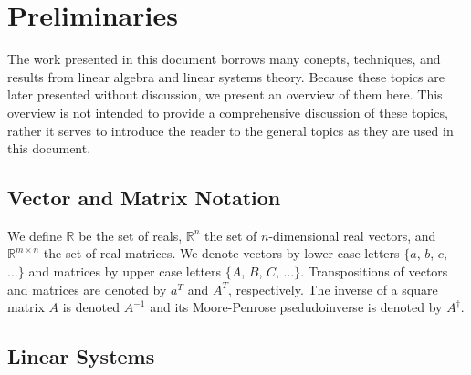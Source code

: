\chapter{Preliminaries}
The work presented in this document borrows many conepts, techniques, and results from linear algebra and linear systems theory. Because these topics are later presented without discussion, we present an overview of them here. This overview is not intended to provide a comprehensive discussion of these topics, rather it serves to introduce the reader to the general topics as they are used in this document.

\section{Vector and Matrix Notation}
We define $\mathbb{R}$ be the set of reals, $\mathbb{R}^n$ the set of $n$-dimensional real vectors, and $\mathbb{R}^{m\times n}$ the set of real matrices. We denote vectors by lower case letters $\{a$, $b$, $c$, $\dots\}$ and matrices by upper case letters $\{A$, $B$, $C$, $\dots\}$. Transpositions of vectors and matrices are denoted by $a^T$ and $A^T$, respectively. The inverse of a square matrix $A$ is denoted $A^{-1}$ and its Moore-Penrose psedudoinverse is denoted by $A^\dagger$.

\section{Linear Systems}
